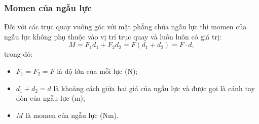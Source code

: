 \subsubsection{Momen của ngẫu lực}
Đối với các trục quay vuông góc với mặt phẳng chứa ngẫu lực thì momen của ngẫu lực không phụ thuộc vào vị trí trục quay và luôn luôn có giá trị: 
\begin{equation*}
	M=F_1d_1+F_2d_2=F(d_1+d_2)=F\cdot d,
\end{equation*}
trong đó:
\begin{itemize}
	\item $F_1=F_2=F$ là độ lớn của mỗi lực ($\text{N}$);
	\item $d_1+d_2=d$ là khoảng cách giữa hai giá của ngẫu lực và được gọi là cánh tay đòn của ngẫu lực ($\text{m}$);
	\item $M$ là momen của ngẫu lực ($\text{Nm}$).
\end{itemize}
